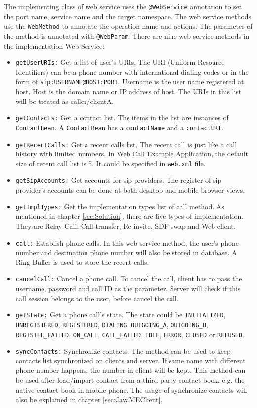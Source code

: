 The implementing class of web service uses the \texttt{@WebService} annotation to set the port name, service name and the target namespace. The web service methods use the \texttt{WebMethod} to annotate the operation name and actions.  The parameter of the method is annotated with \texttt{@WebParam}.
There are nine web service methods in the implementation Web Service:
\begin{itemize}
\item \texttt{getUserURIs:} Get a list of user's URIs. The URI (Uniform Resource Identifiers) can be a phone number with international dialing codes or in the form of \texttt{sip:USERNAME@HOST:PORT}. Username is the user name registered at host. Host is the domain name or IP address of host. The URIs in this list will be treated as caller/clientA. 
\item \texttt{getContacts:} Get a contact list. The items in the list are instances of \texttt{ContactBean}. A \texttt{ContactBean} has a \texttt{contactName} and a \texttt{contactURI}.
\item \texttt{getRecentCalls:} Get a recent calls list. The recent call is just like a call history with limited numbers. In Web Call Example Application, the default size of recent call list is 5. It could be specified in \texttt{web.xml} file.
\item \texttt{getSipAccounts:} Get accounts for sip providers. The register of sip provider's accounts can be done at both desktop and mobile browser views.
\item \texttt{getImplTypes:} Get the implementation types list of call method. As mentioned in chapter \ref{sec:Solution}, there are five types of implementation. They are \textsf{Relay Call}, \textsf{Call transfer}, \textsf{Re-invite}, \textsf{SDP swap} and \textsf{Web client}.
\item \texttt{call:} Establish phone calls. In this web service method, the user's phone number and destination phone number will also be stored in database. A \textsf{Ring Buffer} is used to store the recent calls.
\item \texttt{cancelCall:} Cancel a phone call. To cancel the call, client has to pass the username, password and call ID as the parameter. Server will check if this call session belongs to the user, before cancel the call.
\item \texttt{getState:} Get a phone call's state. The state could be \texttt{INITIALIZED}, \texttt{UNREGISTERED}, \texttt{REGISTERED}, \texttt{DIALING}, \texttt{OUTGOING\_A}, \texttt{OUTGOING\_B}, \linebreak \texttt{REGISTER\_FAILED}, \texttt{ON\_CALL}, \texttt{CALL\_FAILED}, \texttt{IDLE}, \texttt{ERROR}, \texttt{CLOSED} or \texttt{REFUSED}.
\item \texttt{syncContacts:} Synchronize contacts. The method can be used to keep contacts list synchronized on clients and server. If same name with different phone number happens, the number in client will be kept. This method can be used after load/import contact from a third party contact book. e.g. the native contact book in mobile phone. The usage of synchronize contacts will also be explained in chapter \ref{sec:JavaMEClient}.
\end{itemize}

